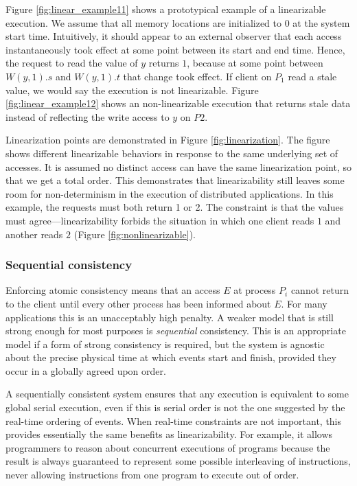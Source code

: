 \documentclass[]             %
{NASA}                       %
\theoremstyle{definition}
\begin{document}
\afterpage{\clearpage}

Figure \ref{fig:linear_example11} shows a prototypical example of a
linearizable execution. We assume that all memory locations are
initialized to \(0\) at the system start time. Intuitively, it should
appear to an external observer that each access instantaneously took
effect at some point between its start and end time. Hence, the request
to read the value of \(y\) returns \(1\), because at some point between
\(W(y,1).s\) and \(W(y,1).t\) that change took effect. If client on
\(P_1\) read a stale value, we would say the execution is not
linearizable. Figure \ref{fig:linear_example12} shows an
non-linearizable execution that returns stale data instead of reflecting
the write access to \(y\) on \(P2\).

Linearization points are demonstrated in Figure
\ref{fig:linearization}.  The figure shows different linearizable
behaviors in response to the same underlying set of accesses. It is
assumed no distinct access can have the same linearization point, so
that we get a total order. This demonstrates that linearizability
still leaves some room for non-determinism in the execution of
distributed applications. In this example, the requests must both
return 1 or 2. The constraint is that the values must
agree---linearizability forbids the situation in which one client
reads \(1\) and another reads \(2\) (Figure
\ref{fig:nonlinearizable}).

\subsubsection{Sequential consistency}
\label{sequential-consistency}

Enforcing atomic consistency means that an access \(E\) at process
\(P_i\) cannot return to the client until every other process has been
informed about \(E\). For many applications this is an unacceptably
high penalty. A weaker model that is still strong enough for most
purposes is \emph{sequential} consistency. This is an appropriate
model if a form of strong consistency is required, but the system is
agnostic about the precise physical time at which events start and
finish, provided they occur in a globally agreed upon order.

A sequentially consistent system ensures that any execution is
equivalent to some global serial execution, even if this is serial order
is not the one suggested by the real-time ordering of events. When
real-time constraints are not important, this provides essentially the
same benefits as linearizability. For example, it allows programmers to
reason about concurrent executions of programs because the result is
always guaranteed to represent some possible interleaving of
instructions, never allowing instructions from one program to execute
out of order.
\end{document}
